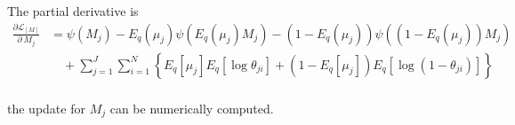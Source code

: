 \documentclass[11pt,reqno]{amsart}
\begin{document}
The partial derivative is
\begin{equation}
\begin{split}
\frac{\partial \mathcal{L}_{{[M]}} }{\partial \ M_j} 
&= \psi(M_j) - E_q(\mu_j) \psi(E_q(\mu_j) M_j)
- (1-E_q(\mu_j)) \psi((1-E_q(\mu_j)) M_j) \\
&\quad + \sum_{j=1}^{J} \sum_{i=1}^{N} \left\lbrace E_q \left[ \mu_j \right] E_q \left[ \log \theta_{ji} \right] 
+ \left( 1 - E_q\left[ \mu_j \right]  \right) E_q\left[ \log \left( 1 - \theta_{ji}\right) \right] \right\rbrace \\
\end{split}
\end{equation}

the update for $ M_j $ can be numerically computed.


\appendix

%
%
\end{document}
